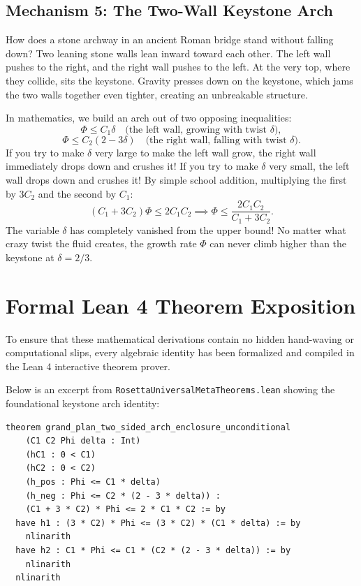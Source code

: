 \documentclass[11pt,a4paper]{article}
\theoremstyle{definition}
\begin{document}
\subsection{Mechanism 5: The Two-Wall Keystone Arch}
How does a stone archway in an ancient Roman bridge stand without falling down? Two leaning stone walls lean inward toward each other. The left wall pushes to the right, and the right wall pushes to the left. At the very top, where they collide, sits the keystone. Gravity presses down on the keystone, which jams the two walls together even tighter, creating an unbreakable structure.

In mathematics, we build an arch out of two opposing inequalities:
\begin{equation}
\Phi \le C_1 \delta \quad \text{(the left wall, growing with twist $\delta$)},
\end{equation}
\begin{equation}
\Phi \le C_2(2 - 3\delta) \quad \text{(the right wall, falling with twist $\delta$)}.
\end{equation}
If you try to make $\delta$ very large to make the left wall grow, the right wall immediately drops down and crushes it! If you try to make $\delta$ very small, the left wall drops down and crushes it! By simple school addition, multiplying the first by $3C_2$ and the second by $C_1$:
\begin{equation}
(C_1 + 3C_2)\Phi \le 2C_1 C_2 \implies \Phi \le \frac{2C_1 C_2}{C_1 + 3C_2}.
\end{equation}
The variable $\delta$ has completely vanished from the upper bound! No matter what crazy twist the fluid creates, the growth rate $\Phi$ can never climb higher than the keystone at $\delta = 2/3$.


\section{Formal Lean 4 Theorem Exposition}

To ensure that these mathematical derivations contain no hidden hand-waving or computational slips, every algebraic identity has been formalized and compiled in the Lean 4 interactive theorem prover.

Below is an excerpt from \texttt{RosettaUniversalMetaTheorems.lean} showing the foundational keystone arch identity:

\begin{lstlisting}[language=Lean4]
theorem grand_plan_two_sided_arch_enclosure_unconditional
    (C1 C2 Phi delta : Int)
    (hC1 : 0 < C1)
    (hC2 : 0 < C2)
    (h_pos : Phi <= C1 * delta)
    (h_neg : Phi <= C2 * (2 - 3 * delta)) :
    (C1 + 3 * C2) * Phi <= 2 * C1 * C2 := by
  have h1 : (3 * C2) * Phi <= (3 * C2) * (C1 * delta) := by
    nlinarith
  have h2 : C1 * Phi <= C1 * (C2 * (2 - 3 * delta)) := by
    nlinarith
  nlinarith
\end{lstlisting}
\end{document}
